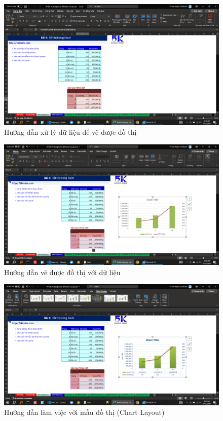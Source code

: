 \documentclass{article}
\begin{document}
\begin{figure}[H]
    \centering
    \includegraphics[scale = 0.15]{Bai2/HuongDan/0.png}
    \caption{Hướng dẫn xử lý dữ liệu để vẽ được đồ thị}
\end{figure}




\begin{figure}[H]
    \centering
    \includegraphics[scale = 0.15]{Bai2/HuongDan/1.png}
    \caption{Hướng dẫn vẽ được đồ thị với dữ liệu}
\end{figure}




\begin{figure}[H]
    \centering
    \includegraphics[scale = 0.15]{Bai2/HuongDan/2.png}
    \caption{Hướng dẫn làm việc với mẫu đồ thị (Chart Layout)}
\end{figure}
\end{document}
